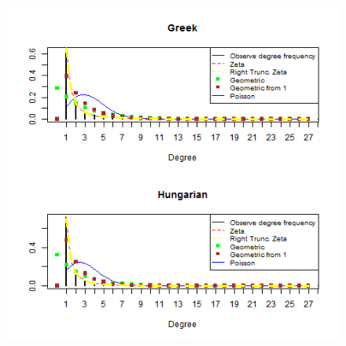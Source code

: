 \documentclass[paper=a4, fontsize=11pt]{scrartcl} %
\theoremstyle{plain}
\begin{document}
\begin{figure}[htbp] %
   \centering
   \includegraphics[width=15cm,height=27cm]{General_4} %
\end{figure}
\end{document}
